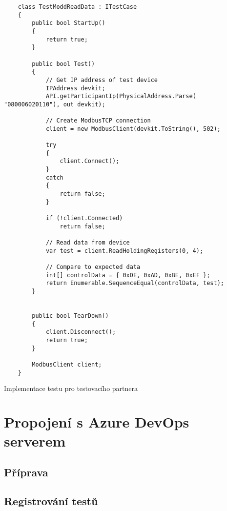 \begin{listing}[htbp]
    \centering{}
    \begin{verbatim}
    class TestModdReadData : ITestCase
    {
        public bool StartUp()
        {
            return true;
        }

        public bool Test()
        {
            // Get IP address of test device
            IPAddress devkit;
            API.getParticipantIp(PhysicalAddress.Parse( "080006020110"), out devkit);

            // Create ModbusTCP connection
            client = new ModbusClient(devkit.ToString(), 502);

            try 
            {
                client.Connect();
            }
            catch 
            {
                return false;
            }

            if (!client.Connected)
                return false;

            // Read data from device
            var test = client.ReadHoldingRegisters(0, 4);
            
            // Compare to expected data
            int[] controlData = { 0xDE, 0xAD, 0xBE, 0xEF };
            return Enumerable.SequenceEqual(controlData, test);
        }


        public bool TearDown()
        {
            client.Disconnect();
            return true;
        }

        ModbusClient client;
    }
    \end{verbatim}
\caption{Implementace testu pro testovacího partnera}
\label{listing:testcase_partner}
\end{listing}


\section{Propojení s Azure DevOps serverem}


\subsection{Příprava}



\subsection{Registrování testů}
